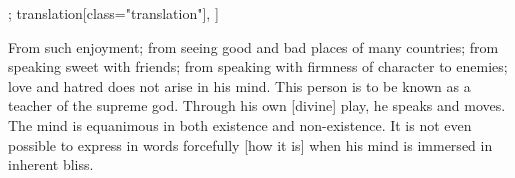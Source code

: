 \begin{alignment}[
  texts=edition[class="edition"];
  translation[class="translation"],
  ]
\begin{translation}
\begin{tlate}
From such enjoyment; from seeing good and bad places of many countries; from speaking sweet with friends; from speaking with firmness of character to enemies; love and hatred does not arise in his mind. This person is to be known as a teacher of the supreme god. Through his own [divine] play, he speaks and moves. The mind is equanimous in both existence and non-existence. It is not even possible to express in words forcefully [how it is] when his mind is immersed in inherent bliss.
    \end{tlate}
  \end{translation}
\end{alignment}
\pagebreak %
